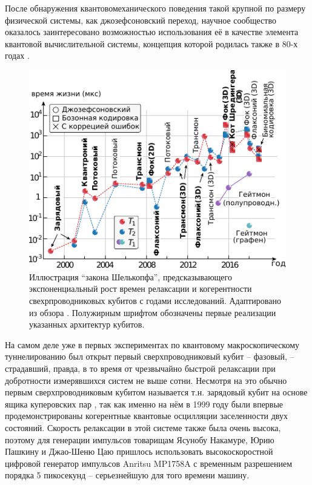 \documentclass[14pt, a4paper]{extreport}
\numberwithin{equation}{section}
\begin{document}
После обнаружения квантовомеханического поведения такой крупной по размеру физической системы, как джозефсоновский переход, научное сообщество оказалось заинтересовано возможностью использования её в качестве элемента квантовой вычислительной системы, концепция которой родилась также в 80-х годах \cite{manin1980, feynman1982simulating}. 


\begin{figure}[t]
	\centering
	\includegraphics[width=.8\linewidth]{shoelkopfs_law.pdf}
	\caption{Иллюстрация ``закона Шелькопфа'', предсказывающего экспоненциальный рост времен релаксации и когерентности свехрпроводниковых кубитов с годами исследований. Адаптировано из обзора \cite{kjaergaard2020superconducting}. Полужирным шрифтом обозначены первые реализации указанных архитектур кубитов.}
	\label{fig:shoelkopfslaw}
\end{figure}

На самом деле уже в первых экспериментах по квантовому макроскопическому туннелированию был открыт первый сверхпроводниковый кубит -- фазовый, -- страдавший, правда, в то время от чрезвычайно быстрой релаксации при добротности измерявшихся систем не выше сотни. Несмотря на это обычно первым сверхпроводниковым кубитом называется т.н. зарядовый кубит на основе ящика куперовских пар \cite{nakamura1999coherent}, так как именно на нём в 1999 году были впервые продемонстрированы когерентные квантовые осцилляции заселенности двух состояний. Скорость релаксации в этой системе также была очень высока, поэтому для генерации импульсов товарищам Ясунобу Накамуре, Юрию Пашкину и Джао-Шеню Цаю пришлось использовать высокоскоростной цифровой генератор импульсов Anritsu MP1758A с временным разрешением порядка 5 пикосекунд -- серьезнейшую для того времени машину. 
\end{document}
